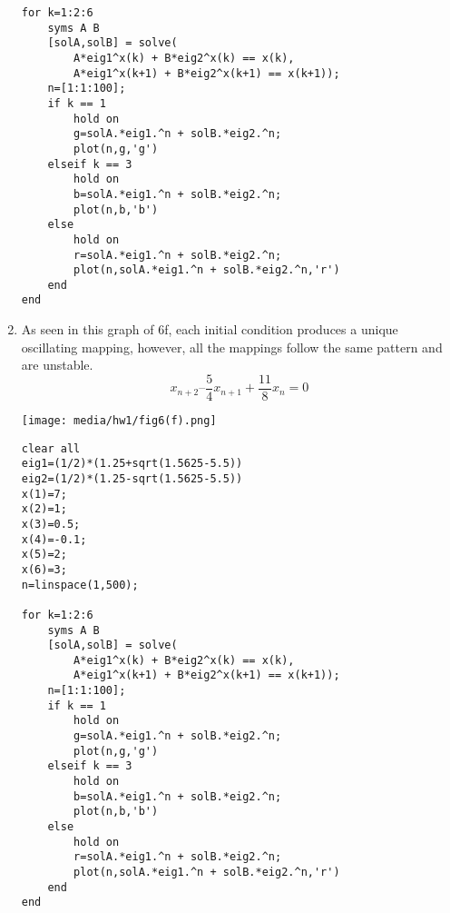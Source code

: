 \documentclass[
    classnum=MATH564,
    classname=MATHEMATICAL\ MODELING,
    due=January\ 28\,\ 2020,
    author=Gabrielle\ Streeter\qquad Hannah\ Wu\qquad\ Minghang\ Li,
    authorshort=Streeter\ \&\ Wu\ \&\ Li,
    teacher= Zachary\ M.\ Boyd,
    hw=1
]{hw-template}
\newenvironment{Figure}
  {\par\medskip\noindent\minipage{\linewidth}}
  {\endminipage\par\medskip}
\begin{document}
\begin{homeworkProblem}[6]
\begin{enumerate}
\begin{listing}[htbp]
\begin{tcolorbox}
\begin{verbatim}
for k=1:2:6
    syms A B
    [solA,solB] = solve(
        A*eig1^x(k) + B*eig2^x(k) == x(k),
        A*eig1^x(k+1) + B*eig2^x(k+1) == x(k+1));
    n=[1:1:100];
    if k == 1
        hold on
        g=solA.*eig1.^n + solB.*eig2.^n;
        plot(n,g,'g')
    elseif k == 3
        hold on
        b=solA.*eig1.^n + solB.*eig2.^n;
        plot(n,b,'b')
    else
        hold on
        r=solA.*eig1.^n + solB.*eig2.^n;
        plot(n,solA.*eig1.^n + solB.*eig2.^n,'r')
    end
end
    \end{verbatim}
    \end{tcolorbox}
\end{listing}
\pagebreak
\addtocounter{enumi}{4}

\item \begin{multicols}{2}
As seen in this graph of 6f, each initial condition produces a unique
oscillating mapping, however, all the mappings follow the same pattern and are
unstable.
$$
x_{n+2} – \frac{5}{4}x_{n+1} + \frac{11}{8}x_n = 0
$$

\begin{Figure}
    \centering
    \texttt{[image: media/hw1/fig6(f).png]}
\end{Figure}
\end{multicols}

\begin{listing}[htbp]
    \begin{tcolorbox}
    \begin{verbatim}
clear all
eig1=(1/2)*(1.25+sqrt(1.5625-5.5))
eig2=(1/2)*(1.25-sqrt(1.5625-5.5))
x(1)=7;
x(2)=1;
x(3)=0.5;
x(4)=-0.1;
x(5)=2;
x(6)=3;
n=linspace(1,500);

for k=1:2:6
    syms A B
    [solA,solB] = solve(
        A*eig1^x(k) + B*eig2^x(k) == x(k),
        A*eig1^x(k+1) + B*eig2^x(k+1) == x(k+1));
    n=[1:1:100];
    if k == 1
        hold on
        g=solA.*eig1.^n + solB.*eig2.^n;
        plot(n,g,'g')
    elseif k == 3
        hold on
        b=solA.*eig1.^n + solB.*eig2.^n;
        plot(n,b,'b')
    else
        hold on
        r=solA.*eig1.^n + solB.*eig2.^n;
        plot(n,solA.*eig1.^n + solB.*eig2.^n,'r')
    end
end
    \end{verbatim}
    \end{tcolorbox}
\end{listing}
\end{enumerate}
\end{homeworkProblem}
\end{document}
